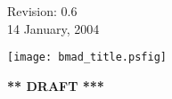 \thispagestyle{empty}

\begin{flushright}
\large
  Revision: 0.6 \\
  14 January, 2004 \\
\end{flushright}

\vfill

{
\begin{center}
\texttt{[image: bmad\_title.psfig]} \\
\end{center}
}

\vskip 1in
\begin{center}
{\Huge \bf *** DRAFT ***}
\end{center}
\vfill
\break